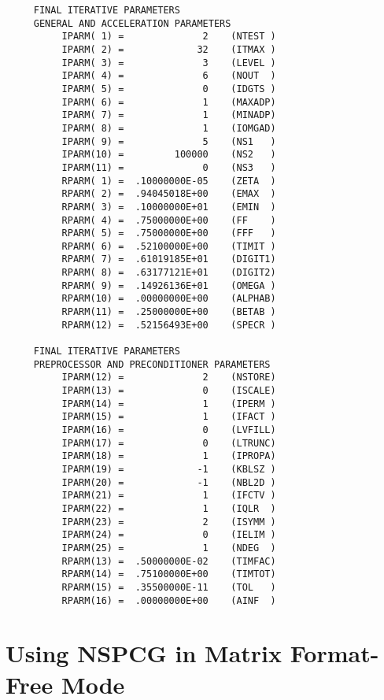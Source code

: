 \newpage
\begin{verbatim}
     FINAL ITERATIVE PARAMETERS
     GENERAL AND ACCELERATION PARAMETERS
          IPARM( 1) =              2    (NTEST )
          IPARM( 2) =             32    (ITMAX )
          IPARM( 3) =              3    (LEVEL )
          IPARM( 4) =              6    (NOUT  )
          IPARM( 5) =              0    (IDGTS )
          IPARM( 6) =              1    (MAXADP)
          IPARM( 7) =              1    (MINADP)
          IPARM( 8) =              1    (IOMGAD)
          IPARM( 9) =              5    (NS1   )
          IPARM(10) =         100000    (NS2   )
          IPARM(11) =              0    (NS3   )
          RPARM( 1) =  .10000000E-05    (ZETA  )
          RPARM( 2) =  .94045018E+00    (EMAX  )
          RPARM( 3) =  .10000000E+01    (EMIN  )
          RPARM( 4) =  .75000000E+00    (FF    )
          RPARM( 5) =  .75000000E+00    (FFF   )
          RPARM( 6) =  .52100000E+00    (TIMIT )
          RPARM( 7) =  .61019185E+01    (DIGIT1)
          RPARM( 8) =  .63177121E+01    (DIGIT2)
          RPARM( 9) =  .14926136E+01    (OMEGA )
          RPARM(10) =  .00000000E+00    (ALPHAB)
          RPARM(11) =  .25000000E+00    (BETAB )
          RPARM(12) =  .52156493E+00    (SPECR )
 
     FINAL ITERATIVE PARAMETERS
     PREPROCESSOR AND PRECONDITIONER PARAMETERS
          IPARM(12) =              2    (NSTORE)
          IPARM(13) =              0    (ISCALE)
          IPARM(14) =              1    (IPERM )
          IPARM(15) =              1    (IFACT )
          IPARM(16) =              0    (LVFILL)
          IPARM(17) =              0    (LTRUNC)
          IPARM(18) =              1    (IPROPA)
          IPARM(19) =             -1    (KBLSZ )
          IPARM(20) =             -1    (NBL2D )
          IPARM(21) =              1    (IFCTV )
          IPARM(22) =              1    (IQLR  )
          IPARM(23) =              2    (ISYMM )
          IPARM(24) =              0    (IELIM )
          IPARM(25) =              1    (NDEG  )
          RPARM(13) =  .50000000E-02    (TIMFAC)
          RPARM(14) =  .75100000E+00    (TIMTOT)
          RPARM(15) =  .35500000E-11    (TOL   )
          RPARM(16) =  .00000000E+00    (AINF  )
\end{verbatim}
    
\newpage
\section{Using NSPCG in Matrix Format-Free Mode}
\label{mffm}
\indent
 
